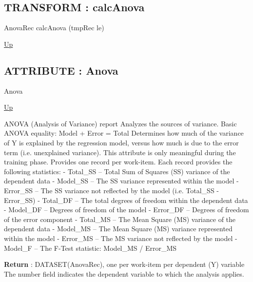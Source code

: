 \par
\par
\subsection*{TRANSFORM : calcAnova}
\hypertarget{ecldoc:linearregression.ols.calcanova}{}
\begin{minipage}[t]{\textwidth}
\begin{flushleft}
AnovaRec calcAnova (tmpRec le)
\end{flushleft}
\end{minipage}
\hyperlink{ecldoc:linearregression.ols}{Up}

\par
\par
\subsection*{ATTRIBUTE : Anova}
\hypertarget{ecldoc:linearregression.ols.anova}{}
\begin{minipage}[t]{\textwidth}
\begin{flushleft}
 Anova 
\end{flushleft}
\end{minipage}
\hyperlink{ecldoc:linearregression.ols}{Up}

\par
ANOVA (Analysis of Variance) report Analyzes the sources of variance. Basic ANOVA equality: Model + Error = Total Determines how much of the variance of Y is explained by the regression model, versus how much is due to the error term (i.e. unexplained variance). This attribute is only meaningful during the training phase. Provides one record per work-item. Each record provides the following statistics: - Total\_SS -- Total Sum of Squares (SS) variance of the dependent data - Model\_SS -- The SS variance represented within the model - Error\_SS -- The SS variance not reflected by the model (i.e. Total\_SS - Error\_SS) - Total\_DF -- The total degrees of freedom within the dependent data - Model\_DF -- Degrees of freedom of the model - Error\_DF -- Degrees of freedom of the error component - Total\_MS -- The Mean Square (MS) variance of the dependent data - Model\_MS -- The Mean Square (MS) variance represented within the model - Error\_MS -- The MS variance not reflected by the model - Model\_F -- The F-Test statistic: Model\_MS / Error\_MS
\par
\textbf{Return} : DATASET(AnovaRec), one per work-item per dependent (Y) variable The number field indicates the dependent variable to which the analysis applies. \\
